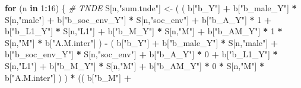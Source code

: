 \documentclass[
]{book}
\newenvironment{Shaded}{\begin{snugshade}}{\end{snugshade}}
\newcommand{\CommentTok}[1]{\textcolor[rgb]{0.56,0.35,0.01}{\textit{#1}}}
\newcommand{\ControlFlowTok}[1]{\textcolor[rgb]{0.13,0.29,0.53}{\textbf{#1}}}
\newcommand{\DecValTok}[1]{\textcolor[rgb]{0.00,0.00,0.81}{#1}}
\newcommand{\NormalTok}[1]{#1}
\newcommand{\OtherTok}[1]{\textcolor[rgb]{0.56,0.35,0.01}{#1}}
\newcommand{\SpecialCharTok}[1]{\textcolor[rgb]{0.81,0.36,0.00}{\textbf{#1}}}
\newcommand{\StringTok}[1]{\textcolor[rgb]{0.31,0.60,0.02}{#1}}
\begin{document}
\begin{Shaded}
\begin{Highlighting}[]
  \ControlFlowTok{for}\NormalTok{ (n }\ControlFlowTok{in} \DecValTok{1}\SpecialCharTok{:}\DecValTok{16}\NormalTok{) \{}
    \CommentTok{\# TNDE }
\NormalTok{    S[n,}\StringTok{"sum.tnde"}\NormalTok{] }\OtherTok{\textless{}{-}}\NormalTok{ ( ( b[}\StringTok{"b\_Y"}\NormalTok{] }\SpecialCharTok{+} 
\NormalTok{                             b[}\StringTok{"b\_male\_Y"}\NormalTok{] }\SpecialCharTok{*}\NormalTok{ S[n,}\StringTok{"male"}\NormalTok{] }\SpecialCharTok{+} 
\NormalTok{                             b[}\StringTok{"b\_soc\_env\_Y"}\NormalTok{] }\SpecialCharTok{*}\NormalTok{ S[n,}\StringTok{"soc\_env"}\NormalTok{] }\SpecialCharTok{+} 
\NormalTok{                             b[}\StringTok{"b\_A\_Y"}\NormalTok{] }\SpecialCharTok{*} \DecValTok{1} \SpecialCharTok{+} 
\NormalTok{                             b[}\StringTok{"b\_L1\_Y"}\NormalTok{] }\SpecialCharTok{*}\NormalTok{ S[n,}\StringTok{"L1"}\NormalTok{] }\SpecialCharTok{+}
\NormalTok{                             b[}\StringTok{"b\_M\_Y"}\NormalTok{] }\SpecialCharTok{*}\NormalTok{ S[n,}\StringTok{"M"}\NormalTok{] }\SpecialCharTok{+}
\NormalTok{                             b[}\StringTok{"b\_AM\_Y"}\NormalTok{] }\SpecialCharTok{*} \DecValTok{1} \SpecialCharTok{*}\NormalTok{ S[n,}\StringTok{"M"}\NormalTok{] }\SpecialCharTok{*}\NormalTok{ b[}\StringTok{"A.M.inter"}\NormalTok{] ) }\SpecialCharTok{{-}} 
\NormalTok{                           ( b[}\StringTok{"b\_Y"}\NormalTok{] }\SpecialCharTok{+} 
\NormalTok{                               b[}\StringTok{"b\_male\_Y"}\NormalTok{] }\SpecialCharTok{*}\NormalTok{ S[n,}\StringTok{"male"}\NormalTok{] }\SpecialCharTok{+} 
\NormalTok{                               b[}\StringTok{"b\_soc\_env\_Y"}\NormalTok{] }\SpecialCharTok{*}\NormalTok{ S[n,}\StringTok{"soc\_env"}\NormalTok{] }\SpecialCharTok{+} 
\NormalTok{                               b[}\StringTok{"b\_A\_Y"}\NormalTok{] }\SpecialCharTok{*} \DecValTok{0} \SpecialCharTok{+} 
\NormalTok{                               b[}\StringTok{"b\_L1\_Y"}\NormalTok{] }\SpecialCharTok{*}\NormalTok{ S[n,}\StringTok{"L1"}\NormalTok{] }\SpecialCharTok{+}
\NormalTok{                               b[}\StringTok{"b\_M\_Y"}\NormalTok{] }\SpecialCharTok{*}\NormalTok{ S[n,}\StringTok{"M"}\NormalTok{] }\SpecialCharTok{+} 
\NormalTok{                               b[}\StringTok{"b\_AM\_Y"}\NormalTok{] }\SpecialCharTok{*} \DecValTok{0} \SpecialCharTok{*}\NormalTok{ S[n,}\StringTok{"M"}\NormalTok{] }\SpecialCharTok{*}\NormalTok{ b[}\StringTok{"A.M.inter"}\NormalTok{] ) ) }\SpecialCharTok{*}
\NormalTok{      (( b[}\StringTok{"b\_M"}\NormalTok{] }\SpecialCharTok{+} 

\end{Highlighting}
\end{Shaded}
\end{document}
